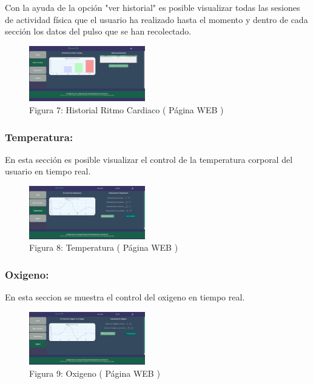\documentclass[osajnl,twocolumn,showpacs,superscriptaddress,10pt]{revtex4-1}
\begin{document}
    Con la ayuda de la opción "ver historial" es posible visualizar todas las sesiones de actividad física que el usuario ha realizado hasta el momento y dentro de cada sección los datos del pulso que se han recolectado.
    
\begin{figure} [H] \centering 
\caption{Figura 7: Historial Ritmo Cardiaco ( Página WEB )}
\includegraphics[width=0.45\textwidth]{RitmoCh.PNG}
\end{figure}

\subsubsection{Temperatura:}
    En esta sección es posible visualizar el control de la temperatura corporal del usuario en tiempo real.
    
\begin{figure} [H] \centering 
\caption{Figura 8: Temperatura ( Página WEB )}
\includegraphics[width=0.45\textwidth]{temp.jpg}
\end{figure}

\subsubsection{Oxigeno:}
    En esta seccion se muestra el control del oxigeno en tiempo real.
    
\begin{figure} [H] \centering 
\caption{Figura 9: Oxigeno ( Página WEB )}
\includegraphics[width=0.45\textwidth]{oxig.jpg}
\end{figure}
\end{document}
